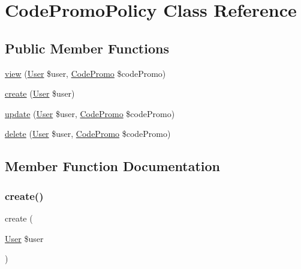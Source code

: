 \hypertarget{class_app_1_1_policies_1_1_code_promo_policy}{}\section{Code\+Promo\+Policy Class Reference}
\label{class_app_1_1_policies_1_1_code_promo_policy}
\subsection*{Public Member Functions}
\begin{DoxyCompactItemize}
\item 
\mbox{\hyperlink{class_app_1_1_policies_1_1_code_promo_policy_a4a4964b1596689afc4c82b61adc03857}{view}} (\mbox{\hyperlink{class_app_1_1_user}{User}} \$user, \mbox{\hyperlink{class_app_1_1_code_promo}{Code\+Promo}} \$code\+Promo)
\item 
\mbox{\hyperlink{class_app_1_1_policies_1_1_code_promo_policy_a7626db07d2ee9a50d2839c019dbf037d}{create}} (\mbox{\hyperlink{class_app_1_1_user}{User}} \$user)
\item 
\mbox{\hyperlink{class_app_1_1_policies_1_1_code_promo_policy_a679f7341be3c85d9f07434e87261f1e9}{update}} (\mbox{\hyperlink{class_app_1_1_user}{User}} \$user, \mbox{\hyperlink{class_app_1_1_code_promo}{Code\+Promo}} \$code\+Promo)
\item 
\mbox{\hyperlink{class_app_1_1_policies_1_1_code_promo_policy_af2ef79e5a3f46ee47cbdbb810425d11d}{delete}} (\mbox{\hyperlink{class_app_1_1_user}{User}} \$user, \mbox{\hyperlink{class_app_1_1_code_promo}{Code\+Promo}} \$code\+Promo)
\end{DoxyCompactItemize}


\subsection{Member Function Documentation}
\mbox{\label{class_app_1_1_policies_1_1_code_promo_policy_a7626db07d2ee9a50d2839c019dbf037d}} 
\subsubsection{\texorpdfstring{create()}{create()}}
{\footnotesize\ttfamily create (\begin{DoxyParamCaption}\item[{\mbox{\hyperlink{class_app_1_1_user}{User}}}]{\$user }\end{DoxyParamCaption})}

